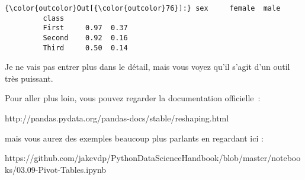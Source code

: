 \begin{Verbatim}[commandchars=\\\{\},frame=single,framerule=0.3mm,rulecolor=\color{cellframecolor}]
{\color{outcolor}Out[{\color{outcolor}76}]:} sex     female  male
         class               
         First     0.97  0.37
         Second    0.92  0.16
         Third     0.50  0.14
\end{Verbatim}
            
    Je ne vais pas entrer plus dans le détail, mais vous voyez qu'il s'agit
d'un outil très puissant.

Pour aller plus loin, vous pouvez regarder la documentation officielle~:

http://pandas.pydata.org/pandas-docs/stable/reshaping.html

mais vous aurez des exemples beaucoup plus parlants en regardant ici :

https://github.com/jakevdp/PythonDataScienceHandbook/blob/master/notebooks/03.09-Pivot-Tables.ipynb


    
    
    
